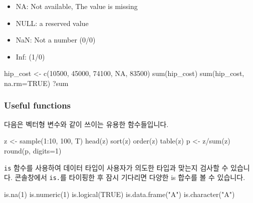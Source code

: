 \documentclass[
  a4paper,
]{book}
\newenvironment{Shaded}{\begin{snugshade}}{\end{snugshade}}
\newcommand{\AttributeTok}[1]{\textcolor[rgb]{0.40,0.45,0.13}{#1}}
\newcommand{\ConstantTok}[1]{\textcolor[rgb]{0.56,0.35,0.01}{#1}}
\newcommand{\DecValTok}[1]{\textcolor[rgb]{0.68,0.00,0.00}{#1}}
\newcommand{\FunctionTok}[1]{\textcolor[rgb]{0.28,0.35,0.67}{#1}}
\newcommand{\NormalTok}[1]{\textcolor[rgb]{0.00,0.23,0.31}{#1}}
\newcommand{\OtherTok}[1]{\textcolor[rgb]{0.00,0.23,0.31}{#1}}
\newcommand{\SpecialCharTok}[1]{\textcolor[rgb]{0.37,0.37,0.37}{#1}}
\newcommand{\StringTok}[1]{\textcolor[rgb]{0.13,0.47,0.30}{#1}}
\providecommand{\tightlist}{%
  \setlength{\itemsep}{0pt}\setlength{\parskip}{0pt}}\usepackage{longtable,booktabs,array}
\begin{document}
\begin{itemize}
\tightlist
\item
  NA: Not available, The value is missing
\item
  NULL: a reserved value
\item
  NaN: Not a number (0/0)
\item
  Inf: (1/0)
\end{itemize}

\begin{Shaded}
\begin{Highlighting}[]
\NormalTok{hip\_cost }\OtherTok{\textless{}{-}} \FunctionTok{c}\NormalTok{(}\DecValTok{10500}\NormalTok{, }\DecValTok{45000}\NormalTok{, }\DecValTok{74100}\NormalTok{, }\ConstantTok{NA}\NormalTok{, }\DecValTok{83500}\NormalTok{)}
\FunctionTok{sum}\NormalTok{(hip\_cost)}
\FunctionTok{sum}\NormalTok{(hip\_cost, }\AttributeTok{na.rm=}\ConstantTok{TRUE}\NormalTok{)}
\NormalTok{?sum}
\end{Highlighting}
\end{Shaded}

\hypertarget{useful-functions}{%
\subsubsection{Useful functions}\label{useful-functions}}

다음은 벡터형 변수와 같이 쓰이는 유용한 함수들입니다.

\begin{Shaded}
\begin{Highlighting}[]
\NormalTok{z }\OtherTok{\textless{}{-}} \FunctionTok{sample}\NormalTok{(}\DecValTok{1}\SpecialCharTok{:}\DecValTok{10}\NormalTok{, }\DecValTok{100}\NormalTok{, T)}
\FunctionTok{head}\NormalTok{(z)}
\FunctionTok{sort}\NormalTok{(z)}
\FunctionTok{order}\NormalTok{(z)}
\FunctionTok{table}\NormalTok{(z)}
\NormalTok{p }\OtherTok{\textless{}{-}}\NormalTok{ z}\SpecialCharTok{/}\FunctionTok{sum}\NormalTok{(z)}
\FunctionTok{round}\NormalTok{(p, }\AttributeTok{digits=}\DecValTok{1}\NormalTok{)}
\end{Highlighting}
\end{Shaded}

\texttt{is} 함수를 사용하여 데이터 타입이 사용자가 의도한 타입과 맞는지
검사할 수 있습니다. 콘솔창에서 \texttt{is.}를 타이핑한 후 잠시 기다리면
다양한 is 합수를 볼 수 있습니다.

\begin{Shaded}
\begin{Highlighting}[]
\FunctionTok{is.na}\NormalTok{(}\DecValTok{1}\NormalTok{)}
\FunctionTok{is.numeric}\NormalTok{(}\DecValTok{1}\NormalTok{)}
\FunctionTok{is.logical}\NormalTok{(}\ConstantTok{TRUE}\NormalTok{)}
\FunctionTok{is.data.frame}\NormalTok{(}\StringTok{"A"}\NormalTok{)}
\FunctionTok{is.character}\NormalTok{(}\StringTok{"A"}\NormalTok{)}
\end{Highlighting}
\end{Shaded}
\end{document}

